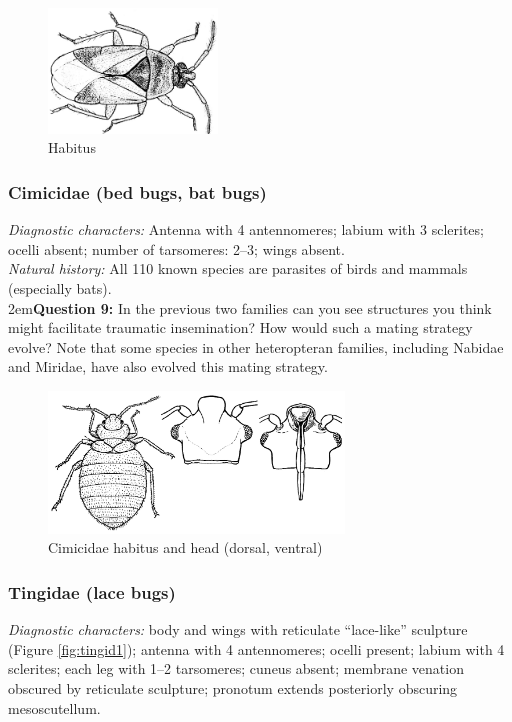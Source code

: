 \documentclass[letterpaper, 11pt]{article}
\begin{document}
\begin{figure}[ht!]
 \centering
 \includegraphics[width=0.4\textwidth]{anthocorid.png}
 \caption{Habitus \citep[][Fig. 15K]{prins1984morphological}}
 \label{fig:anthocorid1}
\end{figure}

\subsubsection{Cimicidae (bed bugs, bat bugs)}
\noindent{}\textit{Diagnostic characters:} Antenna with 4 antennomeres; labium with 3 sclerites; ocelli absent; number of tarsomeres: 2--3; wings absent.\\

\noindent{}\textit{Natural history:} All 110 known species are parasites of birds and mammals (especially bats). \\

\hangindent2em\textbf{Question 9:} In the previous two families can you see structures you think might facilitate traumatic insemination? How would such a mating strategy evolve? Note that some species in other heteropteran families, including Nabidae and Miridae, have also evolved this mating strategy. \\

\begin{figure}[ht!]
 \centering
 \includegraphics[width=0.7\textwidth]{cimicids.png}
 \caption{Cimicidae habitus and head (dorsal, ventral) \citep[Modified from Fig. 38A in][]{snodgrass1944feeding}}
 \label{fig:cimicid1}
\end{figure}

\subsubsection{Tingidae (lace bugs)}
\noindent{}\textit{Diagnostic characters:} body and wings with reticulate ``lace-like'' sculpture (Figure \ref{fig:tingid1}); antenna with 4 antennomeres; ocelli present; labium with 4 sclerites;  each leg with 1--2 tarsomeres; cuneus absent; membrane venation obscured by reticulate sculpture; pronotum extends posteriorly obscuring mesoscutellum.\\
\end{document}
